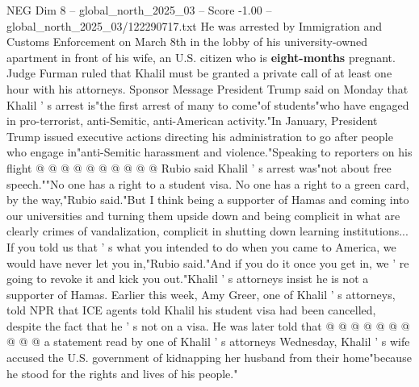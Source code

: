 \begin{textsample}{NEG Dim 8 – global\_north\_2025\_03 – Score -1.00 – global\_north\_2025\_03/122290717.txt}
He was arrested by Immigration and Customs Enforcement on March 8th in the lobby of his university-owned apartment in front of his wife, an U.S. citizen who is \textbf{eight-months} pregnant.
Judge Furman ruled that Khalil must be granted a private call of at least one hour with his attorneys.
Sponsor Message President Trump said on Monday that Khalil ' s arrest is"the first arrest of many to come"of students"who have engaged in pro-terrorist, anti-Semitic, anti-American activity."In January, President Trump issued executive actions directing his administration to go after people who engage in"anti-Semitic harassment and violence."Speaking to reporters on his flight @ @ @ @ @ @ @ @ @ @ Rubio said Khalil ' s arrest was"not about free speech.""No one has a right to a student visa.
No one has a right to a green card, by the way,"Rubio said."But I think being a supporter of Hamas and coming into our universities and turning them upside down and being complicit in what are clearly crimes of vandalization, complicit in shutting down learning institutions...
If you told us that ' s what you intended to do when you came to America, we would have never let you in,"Rubio said."And if you do it once you get in, we ' re going to revoke it and kick you out."Khalil ' s attorneys insist he is not a supporter of Hamas.
Earlier this week, Amy Greer, one of Khalil ' s attorneys, told NPR that ICE agents told Khalil his student visa had been cancelled, despite the fact that he ' s not on a visa.
He was later told that @ @ @ @ @ @ @ @ @ @ a statement read by one of Khalil ' s attorneys Wednesday, Khalil ' s wife accused the U.S. government of kidnapping her husband from their home"because he stood for the rights and lives of his people."

\end{textsample}
